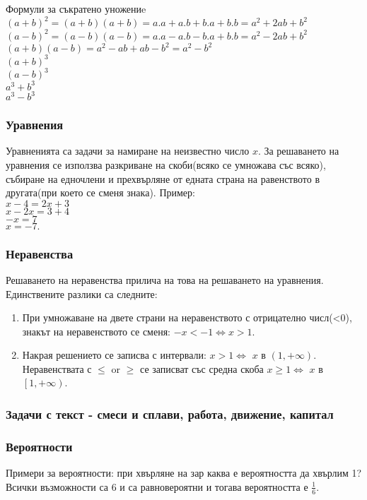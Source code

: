 \documentclass{article}
\begin{document}
	Формули за съкратено уножениe \\
	$(a+b)^2 = (a+b)(a+b)=a.a + a.b + b.a + b.b = a^2 + 2ab + b^2 $ \\
	$(a-b)^2 = (a-b)(a-b)=a.a - a.b - b.a + b.b = a^2 - 2ab + b^2 $\\
	$(a+b)(a-b)= a^2 - ab + ab - b^2 = a^2 - b^2 $\\	
	$(a+b)^3 $\\
	$(a-b)^3 $\\
	$a^3 + b^3 $\\
	$a^3 - b^3 $
	
	\subsubsection{Уравнения}
	Уравненията са задачи за намиране на неизвестно число $x$. За решаването на уравнения се използва разкриване на скоби(всяко се умножава със всяко), събиране на едночлени и прехвърляне от едната страна на равенството в другата(при което се сменя знака).
	Пример: \\
	$ x - 4 = 2x + 3$ \\
	$ x - 2x = 3 + 4 $ \\
	$ -x = 7 $ \\
	$ x = -7. $
	
	\subsubsection{Неравенства}
	Решаването на неравенства прилича на това на решаването на уравнения. Единствените разлики са следните:
	\begin{enumerate}
		\item При умножаване на двете страни на неравенството с отрицателно числ(<0), знакът на неравенството се сменя: $-x<-1  \iff x> 1$.
		\item Накрая решението се записва с интервали: $x>1 \iff$ $x$ в $ (1,+\infty) $.
		Неравенствата с $\leq$ or $\geq$ се записват със средна скоба $x \geq1 \iff$ $x$ в $ \left[1,+\infty \right) $.
	\end{enumerate}
	\subsubsection{Задачи с текст - смеси и сплави, работа, движение, капитал}
	\subsubsection{Вероятности}
	Примери за вероятности: при хвърляне на зар каква е вероятността да хвърлим 1? Всички възможности са 6 и са равновероятни и тогава вероятността е $\frac{1}{6} $.
	
\end{document}
